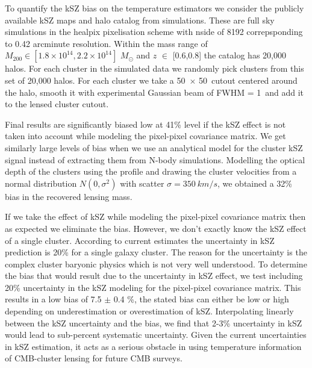 To quantify the kSZ bias on the temperature estimators we consider the publicly available kSZ maps and halo catalog from \citet{flender16} simulations.
These are full sky simulations in the healpix \citep{gorski05} pixelisation scheme with nside of 8192 correpsponding to 0.42 arcminute resolution.
Within the mass range of $M_{200} \in [1.8 \times 10^{14},2.2 \times 10^{14}]$ $M_{\odot}$ and $z$ $\in$ [0.6,0.8] the catalog has 20,000 halos. 
For each cluster in the simulated data we randomly pick clusters from this set of 20,000 halos. For each cluster we take a 50\am\ $\times$ 50\am\ cutout centered around the halo, smooth it with experimental Gaussian beam of FWHM = 1\am\ and add it to the lensed cluster cutout. 

Final results are significantly biased low at 41\% level if the kSZ effect is not taken into account while modeling the pixel-pixel covariance matrix. We get similarly large levels of bias when we use an analytical model for the cluster kSZ signal instead of extracting them from N-body simulations. Modelling the optical depth of the clusters using the \citet{battaglia16b} profile and drawing the cluster velocities from a normal distribution $N(0, \sigma^{2})$ with scatter $\sigma = 350\ km/s$, we obtained a 32\% bias in the recovered lensing mass.
  
 If we take the effect of kSZ while modeling the pixel-pixel covariance matrix then as expected we eliminate the bias. 
 However, we don't exactly know the kSZ effect of a single cluster. According to current estimates the uncertainty in kSZ prediction is 20\% for a single galaxy cluster. 
 The reason for the uncertainty is the complex cluster baryonic physics which is not very well understood. 
 To determine the bias that would result due to the uncertainty in kSZ effect, we test including 20\% uncertainty in the kSZ modeling for the pixel-pixel covariance matrix. 
 This results in a low bias of 7.5 $\pm $ 0.4 \%, the stated bias can either be low or high depending on underestimation or overestimation of kSZ.
 Interpolating linearly between the kSZ uncertainty and the bias, we find that 2-3\% uncertainty in kSZ would lead to sub-percent systematic uncertainty. 
 Given the current uncertainties in kSZ estimation, it acts as a serious obstacle in using temperature information of CMB-cluster lensing for future CMB surveys. 
 
